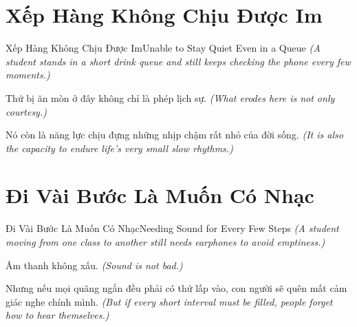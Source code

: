 \section{Xếp Hàng Không Chịu Được Im}
\begin{truyen}{Xếp Hàng Không Chịu Được Im}{Unable to Stay Quiet Even in a Queue}
\textit{(A student stands in a short drink queue and still keeps checking the phone every few moments.)}

Thứ bị ăn mòn ở đây không chỉ là phép lịch sự.
\textit{(What erodes here is not only courtesy.)}

Nó còn là năng lực chịu đựng những nhịp chậm rất nhỏ của đời sống.
\textit{(It is also the capacity to endure life's very small slow rhythms.)}

\end{truyen}

\section{Đi Vài Bước Là Muốn Có Nhạc}
\begin{truyen}{Đi Vài Bước Là Muốn Có Nhạc}{Needing Sound for Every Few Steps}
\textit{(A student moving from one class to another still needs earphones to avoid emptiness.)}

Âm thanh không xấu.
\textit{(Sound is not bad.)}

Nhưng nếu mọi quãng ngắn đều phải có thứ lấp vào, con người sẽ quên mất cảm giác nghe chính mình.
\textit{(But if every short interval must be filled, people forget how to hear themselves.)}

\end{truyen}

